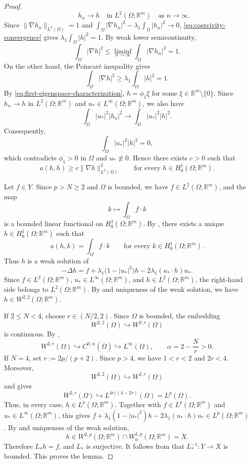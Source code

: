 \documentclass[11pt]{amsart}
\theoremstyle{definition}
\theoremstyle{plain}
\newcommand{\abs}[1]{\lvert#1\rvert}
\newcommand{\norm}[1]{\lVert#1\rVert}
\newcommand{\R}{\mathbb{R}}
\numberwithin{equation}{section}
\begin{document}
\begin{proof}
\begin{equation}
	\qquad
	h_n\to h
	\quad\text{in }L^2(\Omega;\R^m)
	\quad\text{as }n\to\infty.
	\end{equation}
	Since $\norm{\nabla h_n}_{L^2(\Omega)}=1$ and
	$\int_\Omega\abs{\nabla h_n}^2
	-\lambda_1\int_\Omega\abs{h_n}^2\to0$,
	\eqref{eq:coercivity-convergence} gives
	$\lambda_1\int_\Omega\abs{h}^2=1$.
	By weak lower semicontinuity,
	\[
	\int_\Omega\abs{\nabla h}^2
	\leq
	\liminf_{n\to\infty}
	\int_\Omega\abs{\nabla h_n}^2
	=1.
	\]
	On the other hand, the Poincaré inequality gives
	\[
	\int_\Omega\abs{\nabla h}^2
	\geq
	\lambda_1\int_\Omega\abs{h}^2
	=1.
	\]
	By \eqref{eq:first-eigenspace-characterization},
	$h=\phi_1\xi$ for some $\xi\in\R^m\setminus\{0\}$. Since
	$h_n\to h$ in $L^2(\Omega;\R^m)$ and
	$u_*\in L^\infty(\Omega;\R^m)$, we also have
	\[
	\int_\Omega\abs{u_*}^2\abs{h_n}^2
	\to
	\int_\Omega\abs{u_*}^2\abs{h}^2.
	\]
	Consequently,
	\[
	\int_\Omega\abs{u_*}^2\abs{h}^2=0,
	\]
	which contradicts $\phi_1>0$ in $\Omega$ and
	$u_*\not\equiv0$. Hence there exists $c>0$ such that
	\[
	a(h,h)
	\geq
	c\norm{\nabla h}_{L^2(\Omega)}^2
	\qquad
	\text{for every }h\in H_0^1(\Omega;\R^m).
	\]
	
	Let $f\in Y$. Since $p>N\geq2$ and $\Omega$ is bounded, we have
	$f\in L^2(\Omega;\R^m)$, and the map
	\[
	k\longmapsto\int_\Omega f\cdot k
	\]
	is a bounded linear functional on $H_0^1(\Omega;\R^m)$. By
	\cite[Theorem~5.8]{GilbargTrudinger2001}, there exists a unique
	$h\in H_0^1(\Omega;\R^m)$ such that
	\[
	a(h,k)=\int_\Omega f\cdot k
	\qquad
	\text{for every }k\in H_0^1(\Omega;\R^m).
	\]
	Thus $h$ is a weak solution of
	\[
	-\Delta h
	=
	f
	+
	\lambda_1\bigl(1-\abs{u_*}^2\bigr)h
	-
	2\lambda_1(u_*\cdot h)u_*.
	\]
	Since $f\in L^2(\Omega;\R^m)$,
	$u_*\in L^\infty(\Omega;\R^m)$, and
	$h\in L^2(\Omega;\R^m)$, the right-hand side belongs to
	$L^2(\Omega;\R^m)$.
	By \cite[Theorem~9.15]{GilbargTrudinger2001} and uniqueness of the
	weak solution, we have $h\in W^{2,2}(\Omega;\R^m)$.

	If $2\leq N<4$, choose $r\in(N/2,2)$. Since $\Omega$ is bounded, the embedding
	\[
		W^{2,2}(\Omega)\hookrightarrow W^{2,r}(\Omega)
	\]
	is continuous. By \cite[Theorem~7.26(ii)]{GilbargTrudinger2001},
	\[
		W^{2,r}(\Omega)
		\hookrightarrow
		C^{0,\alpha}(\overline{\Omega})
		\hookrightarrow
		L^\infty(\Omega),
		\qquad
		\alpha=2-\frac{N}{r}>0.
	\]
	If $N=4$, set $r:=2p/(p+2)$. Since $p>4$, we have
	$1<r<2$ and $2r<4$. Moreover,
	\[
		W^{2,2}(\Omega)\hookrightarrow W^{2,r}(\Omega)
	\]
	and \cite[Theorem~7.26(i)]{GilbargTrudinger2001} gives
	\[
		W^{2,r}(\Omega)
		\hookrightarrow
		L^{4r/(4-2r)}(\Omega)
		=
		L^p(\Omega).
	\]
	Thus, in every case, $h\in L^p(\Omega;\R^m)$. Together with
	$f\in L^p(\Omega;\R^m)$ and
	$u_*\in L^\infty(\Omega;\R^m)$, this gives
	$f+\lambda_1(1-\abs{u_*}^2)h
	-2\lambda_1(u_*\cdot h)u_*\in L^p(\Omega;\R^m)$. By
	\cite[Theorem~9.15]{GilbargTrudinger2001} and uniqueness of the weak
	solution,
	\[
		h\in W^{2,p}(\Omega;\R^m)\cap W_0^{1,p}(\Omega;\R^m)=X.
	\]
	Therefore $L_*h=f$, and $L_*$ is surjective. It follows from
	\cite[Corollary~2.12(c)]{Rudin1991} that $L_*^{-1}\colon Y\to X$ is
	bounded. This proves the lemma.
\end{proof}
\end{document}
